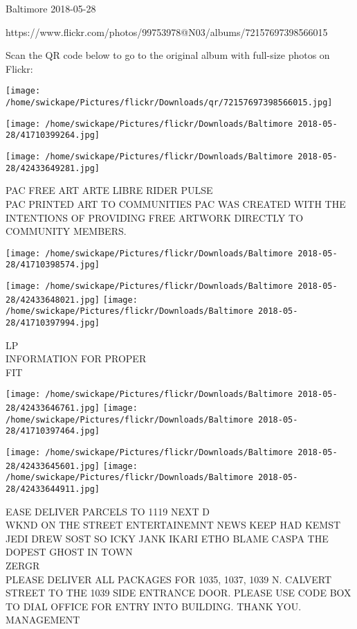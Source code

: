 \documentclass[10pt,letterpaper]{article}
\begin{document}
Baltimore 2018-05-28

https://www.flickr.com/photos/99753978@N03/albums/72157697398566015

Scan the QR code below to go to the original album with full-size photos on Flickr:

\texttt{[image: /home/swickape/Pictures/flickr/Downloads/qr/72157697398566015.jpg]}
\pagebreak

\texttt{[image: /home/swickape/Pictures/flickr/Downloads/Baltimore 2018-05-28/41710399264.jpg]}

\vspace{0.25in}
\texttt{[image: /home/swickape/Pictures/flickr/Downloads/Baltimore 2018-05-28/42433649281.jpg]}

PAC FREE ART ARTE LIBRE RIDER PULSE\\
PAC PRINTED ART TO COMMUNITIES PAC WAS CREATED WITH THE INTENTIONS OF PROVIDING FREE ARTWORK DIRECTLY TO COMMUNITY MEMBERS.\\
\pagebreak

\texttt{[image: /home/swickape/Pictures/flickr/Downloads/Baltimore 2018-05-28/41710398574.jpg]}

\vspace{0.25in}
\texttt{[image: /home/swickape/Pictures/flickr/Downloads/Baltimore 2018-05-28/42433648021.jpg]}
\texttt{[image: /home/swickape/Pictures/flickr/Downloads/Baltimore 2018-05-28/41710397994.jpg]}

LP\\
INFORMATION FOR PROPER\\
FIT\\
\pagebreak

\texttt{[image: /home/swickape/Pictures/flickr/Downloads/Baltimore 2018-05-28/42433646761.jpg]}
\texttt{[image: /home/swickape/Pictures/flickr/Downloads/Baltimore 2018-05-28/41710397464.jpg]}

\texttt{[image: /home/swickape/Pictures/flickr/Downloads/Baltimore 2018-05-28/42433645601.jpg]}
\texttt{[image: /home/swickape/Pictures/flickr/Downloads/Baltimore 2018-05-28/42433644911.jpg]}

EASE DELIVER PARCELS TO 1119 NEXT D\\
WKND ON THE STREET ENTERTAINEMNT NEWS KEEP HAD KEMST JEDI DREW SOST SO ICKY JANK IKARI ETHO BLAME CASPA THE DOPEST GHOST IN TOWN\\
ZERGR\\
PLEASE DELIVER ALL PACKAGES FOR 1035, 1037, 1039 N. CALVERT STREET TO THE 1039 SIDE ENTRANCE DOOR.  PLEASE USE CODE BOX TO DIAL OFFICE FOR ENTRY INTO BUILDING.  THANK YOU.  MANAGEMENT\\
\pagebreak
\end{document}
